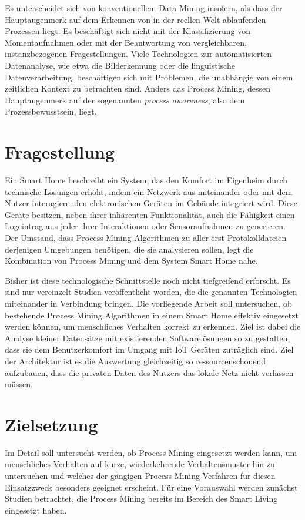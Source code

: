 Es unterscheidet sich von konventionellem Data Mining insofern, als dass der Hauptaugenmerk auf dem Erkennen von in der reellen Welt ablaufenden Prozessen liegt. Es beschäftigt sich nicht mit der Klassifizierung von Momentaufnahmen oder mit der Beantwortung von vergleichbaren, instanzbezogenen Fragestellungen. Viele Technologien zur automatisierten Datenanalyse,  wie etwa die Bilderkennung oder die linguistische Datenverarbeitung, beschäftigen sich mit Problemen, die unabhängig von einem zeitlichen Kontext zu betrachten sind. Anders das Process Mining, dessen Hauptaugenmerk auf der sogenannten \textit{process awareness}, also dem Prozessbewusstsein, liegt.
\section{Fragestellung}
Ein Smart Home beschreibt ein System, das den Komfort im Eigenheim durch technische Lösungen erhöht, indem ein Netzwerk aus miteinander oder mit dem Nutzer interagierenden elektronischen Geräten im Gebäude integriert wird. Diese Geräte besitzen, neben ihrer inhärenten Funktionalität, auch die Fähigkeit einen Logeintrag aus jeder ihrer Interaktionen oder Sensoraufnahmen zu generieren. Der Umstand, dass Process Mining Algorithmen zu aller erst Protokolldateien derjenigen Umgebungen benötigen, die sie analysieren sollen, legt die Kombination von Process Mining und dem System Smart Home nahe.
 
Bisher ist diese technologische Schnittstelle noch nicht tiefgreifend erforscht. Es sind nur vereinzelt Studien veröffentlicht worden, die die genannten Technologien miteinander in Verbindung bringen. Die vorliegende Arbeit soll untersuchen, ob bestehende Process Mining Algorithmen in einem Smart Home effektiv eingesetzt werden können, um menschliches Verhalten korrekt zu erkennen. 
Ziel ist dabei die Analyse kleiner Datensätze mit existierenden Softwarelösungen so zu gestalten, dass sie dem Benutzerkomfort im Umgang mit IoT Geräten zuträglich sind. Ziel der Architektur ist es die Auswertung gleichzeitig so ressourcenschonend aufzubauen, dass die privaten Daten des Nutzers das lokale Netz nicht verlassen müssen.

\section{Zielsetzung}
Im Detail soll untersucht werden, ob Process Mining eingesetzt werden kann, um menschliches Verhalten auf kurze, wiederkehrende Verhaltensmuster hin zu untersuchen und welches der gängigen Process Mining Verfahren für diesen Einsatzzweck besonders geeignet erscheint. 
Für eine Vorauswahl werden zunächst Studien betrachtet, die Process Mining bereits im Bereich des Smart Living eingesetzt haben.

